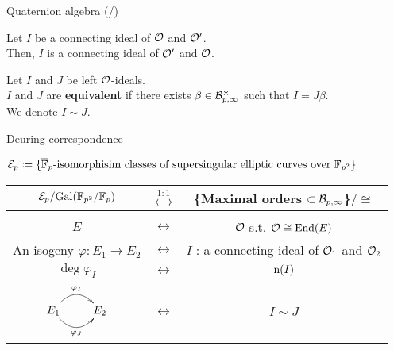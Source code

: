 \begin{frame}{Quaternion algebra (/\quatotal{})}
    \begin{lemma}
        Let $I$ be a connecting ideal of $\mathcal{O}$ and $\mathcal{O}'$.\\
        Then, $\bar{I}$ is a connecting ideal of $\mathcal{O}'$ and $\mathcal{O}$.
    \end{lemma}

    \vspace{10pt}
    \begin{definition}
        Let $I$ and $J$ be left $\mathcal{O}$-ideals.\\
        $I$ and $J$ are \textbf{equivalent}
        if there exists $\beta \in \mathcal{B}_{p,\infty}^{\times}$ such that $I = J\beta$.\\
        We denote $I \sim J$.
    \end{definition}
\end{frame}

\begin{frame}{Deuring correspondence}

    {\fontsize{11pt}{13pt}\selectfont
    $\mathcal{E}_p \coloneqq \{\overline{\mathbb{F}}_p\mbox{-isomorphisim classes of supersingular elliptic curves over }\mathbb{F}_{p^2} \}$\\
    \begin{itembox}{}
        \begin{center}
            \begin{tabular}{ccc}
                $\mathcal{E}_p/\mathrm{Gal}(\mathbb{F}_{p^2}/\mathbb{F}_p)$ & $\stackrel{1:1}{\longleftrightarrow}$
                    & \{Maximal orders $\subset \mathcal{B}_{p,\infty}$\}$/\cong$\\[5pt]\hline\\[5pt]
                $E$  & $\longleftrightarrow$
                    & $\mathcal{O}$ s.t. $\mathcal{O} \cong \mathrm{End}(E)$\\[7pt]
                An isogeny $\varphi: E_1 \to E_2$ & $\longleftrightarrow$
                    & $I$ : a connecting ideal of $\mathcal{O}_1$ and $\mathcal{O}_2$\\[7pt]
                $\deg\varphi_I$ & $\longleftrightarrow$ & $\mathrm{n}(I)$\\[7pt]
                $\xymatrix{
                    E_1 \ar@/^15pt/[r]^{{\varphi_I}} \ar@/_15pt/[r]_{{\varphi_J}} & E_2
                }$ & $\longleftrightarrow$ & $I \sim J$
            \end{tabular}
        \end{center}
    \end{itembox}
    }
\end{frame}


